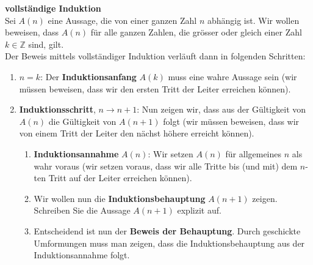\begin{mdframed}[backgroundcolor=green!20,nobreak=true]\label{vorgehen_induktion}
	\textbf{vollständige Induktion}\\
	Sei $A(n)$ eine Aussage, die von einer ganzen Zahl $n$ abhängig ist. Wir wollen beweisen, dass $A(n)$ für alle ganzen Zahlen, die grösser oder gleich einer Zahl $k\in\mathbb{Z}$ sind, gilt.\\
	Der Beweis mittels vollständiger Induktion verläuft dann in folgenden Schritten:
	\begin{enumerate}
		\item $n = k$: Der \textbf{Induktionsanfang} $A(k)$ muss eine wahre Aussage sein (wir müssen beweisen, dass wir den ersten Tritt der Leiter erreichen können).
		\item \textbf{Induktionsschritt}, $n\to n+1$: Nun zeigen wir, dass aus der Gültigkeit von $A(n)$ die Gültigkeit von $A(n+1)$ folgt (wir müssen beweisen, dass wir von einem Tritt der Leiter den nächst höhere erreicht können).
		      \begin{enumerate}
			      \item \textbf{Induktionsannahme} $A(n)$: Wir setzen $A(n)$ für allgemeines $n$ als wahr voraus (wir setzen voraus, dass wir alle Tritte bis (und mit) dem $n$-ten Tritt auf der Leiter erreichen können).
			      \item Wir wollen nun die \textbf{Induktionsbehauptung} $A(n+1)$ zeigen. Schreiben Sie die Aussage $A(n+1)$ explizit auf.
			      \item Entscheidend ist nun der \textbf{Beweis der Behauptung}. Durch geschickte Umformungen muss man zeigen, dass die Induktionsbehauptung aus der Induktionsannahme folgt.
		      \end{enumerate}
	\end{enumerate}
\end{mdframed}


